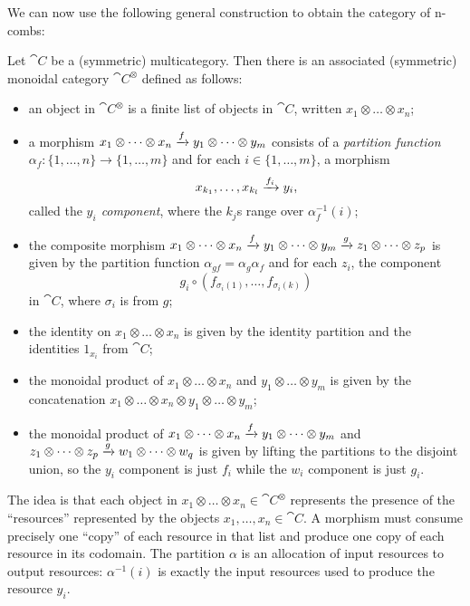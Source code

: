 We can now use the following general construction to obtain the category of
n-combs:

\begin{dfn}\label{def:associated-monoidal-category}
  Let $\cat{C}$ be a (symmetric) multicategory. Then there is an associated
  (symmetric) monoidal category $\cat{C}^\otimes$ defined as follows:
  \begin{itemize}
    \item an object in $\cat{C}^\otimes$ is a finite list of objects in
      $\cat{C}$, written $x_1\otimes\dots\otimes x_n$;
    \item a morphism $x_1\otimes\dots\otimes x_n\xrightarrow{f} y_1\otimes \dots\otimes
      y_m$ consists of a \emph{partition function}
      $\alpha_f: \{1,\dots,n\}\to\{1,\dots,m\}$ and for each $i\in\{1,\dots,m\}$, a morphism \[
        x_{k_1}, \dots, x_{k_l}\xrightarrow{f_i} y_i,
      \] called the \emph{$y_i$ component}, where the $k_j$s range over
      $\alpha_f^{-1}(i)$;
    \item the composite morphism $x_1\otimes\dots\otimes
      x_n\xrightarrow{f}y_1\otimes\dots\otimes y_m\xrightarrow{g}z_1\otimes\dots\otimes z_p$ is
      given by the partition function $\alpha_{gf} = \alpha_g\alpha_f$ and for
      each $z_i$, the component \[
        g_i\circ(f_{\sigma_i(1)},\dots,f_{\sigma_i(k)})
      \]in $\cat{C}$, where $\sigma_i$ is from $g$;
    \item the identity on $x_1\otimes\dots\otimes x_n$ is given by the identity
      partition and the identities $1_{x_i}$ from $\cat{C}$;
    \item the monoidal product of $x_1\otimes\dots\otimes x_n$ and
      $y_1\otimes\dots\otimes y_m$ is given by the concatenation
      $x_1\otimes\dots\otimes x_n\otimes y_1\otimes \dots\otimes y_m$;
    \item the monoidal product of $x_1\otimes\dots\otimes x_n\xrightarrow{f} y_1\otimes\dots\otimes y_m$
      and $z_1\otimes\dots\otimes z_p\xrightarrow{g} w_1\otimes\dots\otimes w_q$ is given
      by lifting the partitions to the disjoint union, so the $y_i$
      component is just $f_i$ while the $w_i$ component is just $g_i$.
  \end{itemize}
\end{dfn}

The idea is that each object in $x_1\otimes\dots\otimes x_n\in\cat{C}^\otimes$
represents the presence of the ``resources'' represented by the objects
$x_1,\dots,x_n\in\cat{C}$. A morphism must consume precisely one ``copy'' of
each resource in that list and produce one copy of each resource in its
codomain. The partition $\alpha$ is an allocation of input resources to output
resources: $\alpha^{-1}(i)$ is exactly the input resources used to produce the
resource $y_i$.

